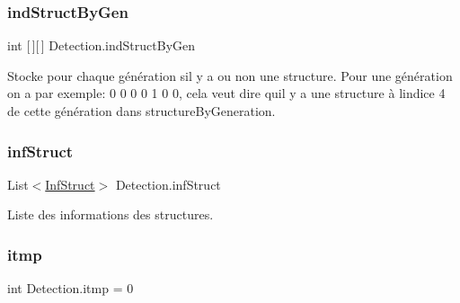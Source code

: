\mbox{\label{class_detection_a7cffb153fd4b42ba87d6a099e31a424e}} 
\subsubsection{\texorpdfstring{ind\+Struct\+By\+Gen}{indStructByGen}}
{\footnotesize\ttfamily int \mbox{[}$\,$\mbox{]}\mbox{[}$\,$\mbox{]} Detection.\+ind\+Struct\+By\+Gen\hspace{0.3cm}{\ttfamily [private]}}



Stocke pour chaque génération s\textquotesingle{}il y a ou non une structure. Pour une génération on a par exemple\+: 0 0 0 0 1 0 0, cela veut dire qu\textquotesingle{}il y a une structure à l\textquotesingle{}indice 4 de cette génération dans structure\+By\+Generation. 

\mbox{\label{class_detection_a33e61516c561856189732c12d7182b1e}} 
\subsubsection{\texorpdfstring{inf\+Struct}{infStruct}}
{\footnotesize\ttfamily List$<$\mbox{\hyperlink{class_inf_struct}{Inf\+Struct}}$>$ Detection.\+inf\+Struct\hspace{0.3cm}{\ttfamily [private]}}



Liste des informations des structures. 

\mbox{\label{class_detection_a8b4cfe5136dffcd0f3196db073042fbe}} 
\subsubsection{\texorpdfstring{itmp}{itmp}}
{\footnotesize\ttfamily int Detection.\+itmp = 0\hspace{0.3cm}{\ttfamily [private]}}

\mbox{\label{class_detection_a22ac4a8c7bfff75ddde6599e2868383d}} 
